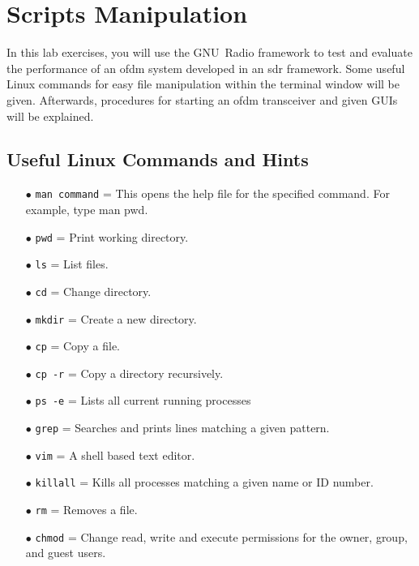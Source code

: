 \chapter {Scripts Manipulation}

In this lab exercises, you will use the GNU~Radio framework to test and evaluate the performance of an \gls{ofdm} system developed in an \gls{sdr} framework. Some useful Linux commands for easy file manipulation within the terminal window will be given. Afterwards, procedures for starting an \gls{ofdm} transceiver and given GUIs will be explained.

\section{Useful Linux Commands and Hints}
\begin{itemize}
	\item[$\bullet$] \texttt{man {command}} = This opens the help file for the specified command. For example, type man pwd.
	\item[$\bullet$] \texttt{pwd} = Print working directory.
	\item[$\bullet$] \texttt{ls} = List files.
	\item[$\bullet$] \texttt{cd} = Change directory.
	\item[$\bullet$] \texttt{mkdir} = Create a new directory.
	\item[$\bullet$] \texttt{cp} = Copy a file.
	\item[$\bullet$] \texttt{cp -r} = Copy a directory recursively.
	\item[$\bullet$] \texttt{ps -e} = Lists all current running processes
	\item[$\bullet$] \texttt{grep} = Searches and prints lines matching a given pattern.
	\item[$\bullet$] \texttt{vim} = A shell based text editor.
	\item[$\bullet$] \texttt{killall} = Kills all processes matching a given name or ID number.
	\item[$\bullet$] \texttt{rm} = Removes a file.
	\item[$\bullet$] \texttt{chmod} = Change read, write and execute permissions for the owner, group, and guest users.

\end{itemize}
